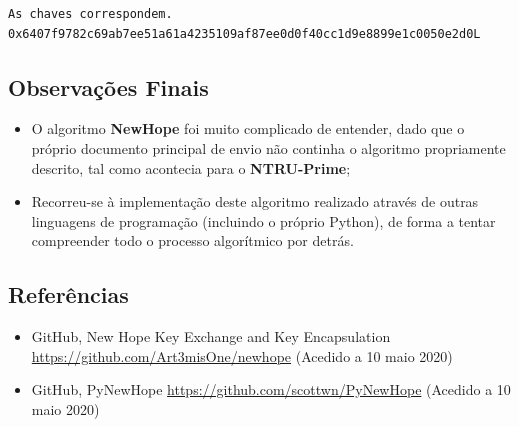 \documentclass[12pt]{report}
\providecommand{\tightlist}{%
      \setlength{\itemsep}{0pt}\setlength{\parskip}{0pt}}
\begin{document}
    \begin{Verbatim}[commandchars=\\\{\}]
As chaves correspondem.
0x6407f9782c69ab7ee51a61a4235109af87ee0d0f40cc1d9e8899e1c0050e2d0L

    \end{Verbatim}

    \subsection{Observações Finais}\label{observauxe7uxf5es-finais}
\vspace{2mm}

\begin{itemize}
\tightlist
\item
  O algoritmo \textbf{NewHope} foi muito complicado de entender, dado que o próprio documento principal de envio não continha o algoritmo propriamente descrito, tal como acontecia para o \textbf{NTRU-Prime};
\item
Recorreu-se à implementação deste algoritmo realizado através de outras linguagens de programação (incluindo o próprio Python), de forma a tentar compreender todo o processo algorítmico por detrás.
\end{itemize}

    \subsection{Referências}\label{referuxeancias}
\vspace{2mm}

\begin{itemize}
\tightlist
\item
  GitHub, New Hope Key Exchange and Key Encapsulation \url{https://github.com/Art3misOne/newhope} (Acedido a 10 maio
  2020)
\item
 GitHub, PyNewHope \url{https://github.com/scottwn/PyNewHope} (Acedido a 10 maio 2020)
\end{itemize}

    
\end{document}
